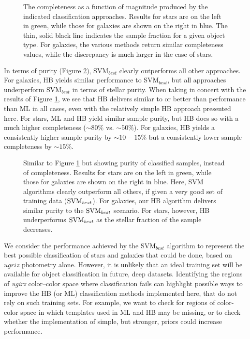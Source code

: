 \documentclass[12pt,preprint]{aastex}
\begin{document}
\begin{figure}
\centering
\caption{The completeness as a function of magnitude produced by the
  indicated classification approaches.  Results for stars are on the
  left in green, while those for galaxies are shown on the right in
  blue.  The thin, solid black line indicates the sample fraction for
  a given object type.  For galaxies, the various methods return
  similar completeness values, while the discrepancy is much larger in
  the case of stars.}
\label{fig:completeness}
\end{figure}


In terms of purity (Figure
\ref{fig:purity}), SVM$_{best}$ clearly outperforms all other
approaches.  For galaxies, HB yields
similar performance to SVM$_{best}$, but all approaches underperform
SVM$_{best}$ in terms of stellar purity.  When taking in concert with the results of Figure \ref{fig:completeness}, we see that HB
delivers similar to or better than performance than ML in all cases,
even with the relatively simple HB approach presented here.  For stars, ML and HB yield similar sample purity, but HB does so with a much higher completeness ($\sim 80\%$ vs. $\sim 50\%$).  For galaxies, HB yields a consistently higher sample purity by $\sim 10-15\%$ but a consistently lower sample completeness by $\sim15\%$.


\begin{figure}
\centering
\caption{Similar to Figure \ref{fig:completeness} but showing purity
  of classified samples, instead of completeness. Results for stars are on the left in green, while those for galaxies are shown on the right in blue.  Here, SVM algorithms 
  clearly outperform all others, if given a very good set of training
  data (${\rm SVM}_{best}$).  For galaxies, our HB algorithm delivers
  similar purity to the ${\rm SVM}_{best}$ scenario.  For stars,
  however, HB underperforms ${\rm SVM}_{best}$ as the stellar fraction
  of the sample decreases.}
\label{fig:purity}
\end{figure}

We consider the performance achieved by the SVM$_{best}$ algorithm to represent the best possible classification of stars and galaxies that could be done, based on $ugriz$ photometry alone.   However, it is unlikely that an ideal training set will be available for object classification in future, deep datasets.  Identifying the regions of {\it ugirz} color--color
space where classification fails can highlight possible ways to improve the HB (or ML) classification methods implemented here, that do not rely on such training sets.  For example, we want to check for regions of color-color space in which templates used in ML and HB may be missing, or to check whether the implementation of simple, but stronger, priors could increase performance.   
\end{document}
